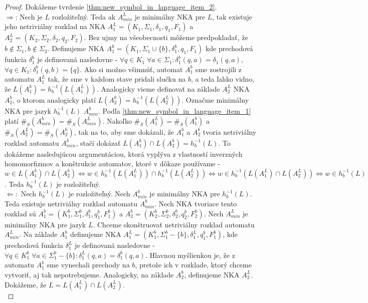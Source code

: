 \begin{proof}
\par
Dokážeme tvrdenie \ref{thm:new_symbol_in_language_item_2}. \\
$ \Rightarrow $: Nech je $ L $ rozložiteľný. Teda ak $ A_{min}^L $ je minimálny NKA pre $ L $, tak existuje jeho netriviálny rozklad na NKA $ A_1^{L}=(K_1, \Sigma_1, \delta_1, q_1, F_1) $ a $ A_2^{L}=(K_2, \Sigma_2, \delta_2, q_2, F_2) $. Bez ujmy na všeobecnosti môžeme predpokladať, že $ b \notin \Sigma_1,b \notin \Sigma_2 $.  Definujeme NKA $ A_1^{b} = (K_1, \Sigma_1 \cup \lbrace b \rbrace, \delta_1^b, q_1, F_1) $ kde prechodová funkcia $ \delta_1^b $ je definovaná nasledovne - $ \forall q \in K_1 \; \forall a \in \Sigma_1: \delta_1^b(q,a)=\delta_1(q,a) $, $ \forall q \in K_1 : \delta_1^b(q,b) =  \lbrace q \rbrace$. Ako si možno všimnúť, automat $ A_1^{b} $ sme zostrojili z automatu $ A_1^L $ tak, že sme v každom stave pridali slučku na $ b $, a teda ľahko vidno, že $ L(A_1^{b}) = h_{b}^{-1}(L(A_1^L)) $. Analogicky vieme definovať na základe $ A_2^L $ NKA $ A_2^{b} $, o ktorom analogicky platí $ L(A_2^{b}) = h_{b}^{-1}(L(A_2^L)) $. Označme minimálny NKA pre jazyk $ h_b^{-1}(L) $ $ A_{min}^b $. Podľa \ref{thm:new_symbol_in_language_item_1} platí $ \#_S(A_{min}^b) = \#_S(A_{min}^L) $. Nakoľko $ \#_S(A_1^L) = \#_S(A_1^b) $ a $ \#_S(A_2^L) = \#_S(A_2^b) $, tak na to, aby sme dokázali, že $ A_1^b $ a $ A_2^b $ tvoria netriviálny rozklad automatu $ A_{min}^b $, stačí dokázať $ L(A_1^b) \cap L(A_2^b) = h_b^{-1}(L) $. To dokážeme nasledujúcou argumentáciou, ktorá vyplýva z vlastností inverzných homomorfizmov a konštrukcie automatov, ktoré v dôkaze používame - $ w \in L(A_1^b) \cap L(A_2^b) \Leftrightarrow w \in h_b^{-1}(L(A_1^L)) \cap h_b^{-1}(L(A_2^L)) \Leftrightarrow w \in h_b^{-1}(L(A_1^L) \cap L(A_2^L)) \Leftrightarrow w \in h_b^{-1}(L) $. Teda $ h_b^{-1}(L) $ je rozložiteľný. \\
$ \Leftarrow: $ Nech $ h_b^{-1}(L) $ je rozložiteľný. Nech $ A^b_{min} $ je minimálny NKA pre $ h_b^{-1}(L) $. Teda existuje netriviálny rozklad automatu $ A^b_{min} $. Nech NKA tvoriace tento rozklad sú $ A_1^b = (K_1^b,\Sigma_1^b,\delta_1^b,q_1^b,F_1^b) $ a $ A_2^b = (K_2^b,\Sigma_2^b,\delta_2^b,q_2^b,F_2^b) $. Nech $ A^L_{min} $ je minimálny NKA pre jazyk $ L $. Chceme skonštruovať netriviálny rozklad automatu $ A^L_{min} $. Na základe $ A_1^b $ definujeme NKA $ A_1^L = (K_1^b,\Sigma_1^b - \lbrace b \rbrace,\delta_1^L,q_1^b,F_1^b) $, kde prechodová funkcia $ \delta_1^L $ je definovaná nasledovne - $ \forall q \in K_1^b \; \forall a \in \Sigma_1^b - \lbrace b \rbrace : \delta_1^L(q,a) = \delta_1^b(q,a) $. Hlavnou myšlienkou je, že z automatu $ A_1^b $ sme vynechali prechody na $ b $, pretože ich v rozklade, ktorý chceme vytvoriť, aj tak nepotrebujeme. Analogicky, na základe $ A_2^b $, definujeme NKA $ A_2^L $. Dokážeme, že $ L = L(A_1^L) \cap L(A_2^L) $. \\

\end{proof}
